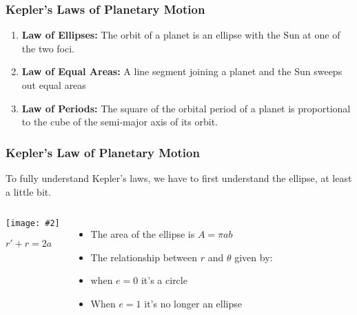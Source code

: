 \documentclass[12pt,compress,aspectratio=169]{beamer}
\newcommand{\pic}[2]{\texttt{[image: \#2]}}
\begin{document}
\begin{frame}
  \frametitle{Kepler's Laws of Planetary Motion}
  \begin{enumerate}
  \item\textbf{Law of Ellipses:} The orbit of a planet is an ellipse with the
    Sun at one of the two foci.
  \item\textbf{Law of Equal Areas:} A line segment joining a planet and the Sun
    sweeps out equal areas
  \item \textbf{Law of Periods:} The square of the orbital period of a planet
    is proportional to the cube of the semi-major axis of its orbit.
  \end{enumerate}
\end{frame}


\begin{frame}
  \frametitle{Kepler's Law of Planetary Motion}
  To fully understand Kepler's laws, we have to first understand the ellipse,
  at least a little bit.

  \begin{columns}
    \begin{center}
      \pic{1.25}{elliporb.png}
      
      $r' + r =2a$
    \end{center}
    \begin{itemize}
    \item The area of the ellipse is $A=\pi ab$
    \item The relationship between $r$ and $\theta$ given by:

    \item when $e=0$ it's a circle
    \item When $e=1$ it's no longer an ellipse
    \end{itemize}
  \end{columns}
\end{frame}
\end{document}
